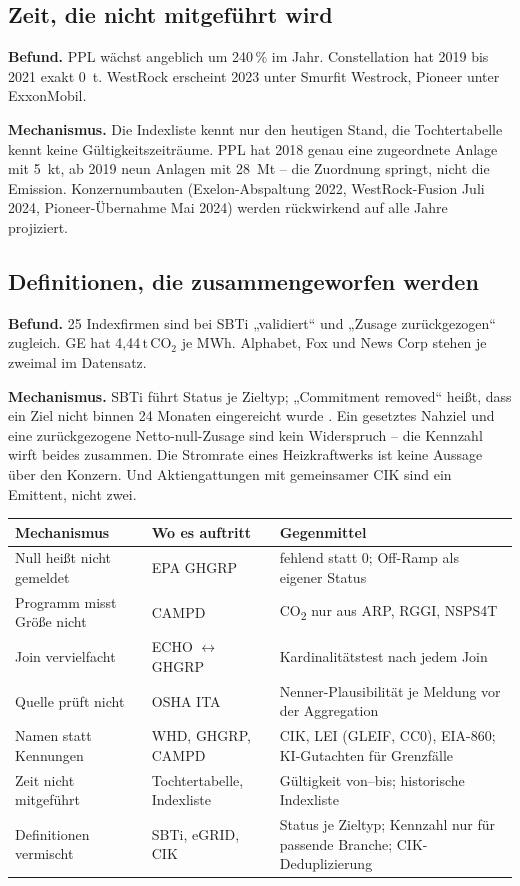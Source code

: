 \documentclass[11pt,a4paper]{article}
\newcommand{\tco}{\ensuremath{\mathrm{t\,CO}_{2}}}
\begin{document}
\subsection{Zeit, die nicht mitgeführt wird}

\textbf{Befund.} PPL wächst angeblich um 240\,\% im Jahr. Constellation hat 2019 bis 2021 exakt 0~t. WestRock erscheint 2023 unter Smurfit Westrock, Pioneer unter ExxonMobil.

\textbf{Mechanismus.} Die Indexliste kennt nur den heutigen Stand, die Tochtertabelle kennt keine Gültigkeitszeiträume. PPL hat 2018 genau eine zugeordnete Anlage mit 5~kt, ab 2019 neun Anlagen mit 28~Mt -- die Zuordnung springt, nicht die Emission. Konzernumbauten (Exelon-Abspaltung 2022, WestRock-Fusion Juli 2024, Pioneer-Übernahme Mai 2024) werden rückwirkend auf alle Jahre projiziert.

\subsection{Definitionen, die zusammengeworfen werden}

\textbf{Befund.} 25 Indexfirmen sind bei SBTi „validiert“ und „Zusage zurückgezogen“ zugleich. GE hat 4{,}44\,\tco{} je MWh. Alphabet, Fox und News Corp stehen je zweimal im Datensatz.

\textbf{Mechanismus.} SBTi führt Status je Zieltyp; „Commitment removed“ heißt, dass ein Ziel nicht binnen 24 Monaten eingereicht wurde \cite{sbtistatus}. Ein gesetztes Nahziel und eine zurückgezogene Netto-null-Zusage sind kein Widerspruch -- die Kennzahl wirft beides zusammen. Die Stromrate eines Heizkraftwerks ist keine Aussage über den Konzern. Und Aktiengattungen mit gemeinsamer CIK sind ein Emittent, nicht zwei.

\begin{center}\footnotesize
\begin{tabularx}{\textwidth}{P{3.2cm} P{3.6cm} X}
\toprule
\textbf{Mechanismus} & \textbf{Wo es auftritt} & \textbf{Gegenmittel} \\
\midrule
Null heißt nicht gemeldet & EPA GHGRP & fehlend statt 0; Off-Ramp als eigener Status \\
Programm misst Größe nicht & CAMPD & CO\textsubscript{2} nur aus ARP, RGGI, NSPS4T \\
Join vervielfacht & ECHO $\leftrightarrow$ GHGRP & Kardinalitätstest nach jedem Join \\
Quelle prüft nicht & OSHA ITA & Nenner-Plausibilität je Meldung vor der Aggregation \\
Namen statt Kennungen & WHD, GHGRP, CAMPD & CIK, LEI (GLEIF, CC0), EIA-860; KI-Gutachten für Grenzfälle \\
Zeit nicht mitgeführt & Tochtertabelle, Indexliste & Gültigkeit von--bis; historische Indexliste \\
Definitionen vermischt & SBTi, eGRID, CIK & Status je Zieltyp; Kennzahl nur für passende Branche; CIK-Deduplizierung \\
\bottomrule
\end{tabularx}
\end{center}
\end{document}
